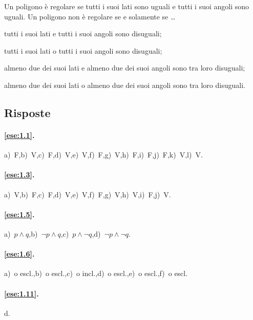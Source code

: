 \begin{esercizio}
\label{ese:1.133}
Un poligono è regolare se tutti i suoi lati sono uguali e tutti i suoi angoli sono uguali. Un poligono non è regolare se e solamente se \ldots
\begin{enumeratea}
\item tutti i suoi lati e tutti i suoi angoli sono disuguali;
\item tutti i suoi lati o tutti i suoi angoli sono disuguali;
\item almeno due dei suoi lati e almeno due dei suoi angoli sono tra loro disuguali;
\item almeno due dei suoi lati o almeno due dei suoi angoli sono tra loro disuguali.
\end{enumeratea}
\end{esercizio}


\subsection{Risposte}

\begingroup
\hypersetup{linkcolor=black}

\paragraph{\ref{ese:1.1}.}
a)~F,\quad b)~V,\quad c)~F,\quad d)~V,\quad e)~V,\quad f)~F,\quad g)~V,\quad h)~F,\quad i)~F,\quad j)~F,\quad k)~V,\quad l)~V.

\paragraph{\ref{ese:1.3}.}
a)~V,\quad b)~F,\quad c)~F,\quad d)~V,\quad e)~V,\quad f)~F,\quad g)~V,\quad h)~V,\quad i)~F,\quad j)~V.

\paragraph{\ref{ese:1.5}.}
a)~$p\wedge q$,\quad b)~$\neg p\wedge q$,\quad c)~$p\wedge \neg q$,\quad d)~$\neg p \wedge \neg q$.

\paragraph{\ref{ese:1.6}.}
a)~o escl\@.,\quad b)~o escl\@.,\quad c)~o incl\@.,\quad d)~o escl\@.,\quad e)~o escl\@.,\quad f)~o escl.

\paragraph{\ref{ese:1.11}.}
d.

